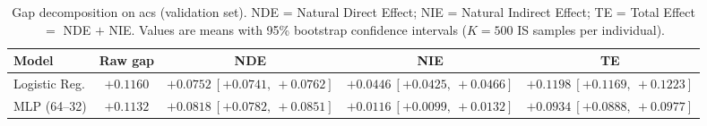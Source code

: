 \begin{table}[htbp]
  \centering
  \caption{Gap decomposition on acs (validation set). NDE = Natural Direct Effect; NIE = Natural Indirect Effect; TE = Total Effect $=$ NDE $+$ NIE. Values are means with 95\% bootstrap confidence intervals ($K=500$ IS samples per individual).}
  \label{tab:acs_gap_overall}
  \begin{tabular}{lcccc}
    \toprule
    Model & Raw gap & NDE & NIE & TE \\
    \midrule
    Logistic Reg. & $+0.1160$ & $+0.0752\ [+0.0741,\ +0.0762]$ & $+0.0446\ [+0.0425,\ +0.0466]$ & $+0.1198\ [+0.1169,\ +0.1223]$ \\
    MLP (64--32) & $+0.1132$ & $+0.0818\ [+0.0782,\ +0.0851]$ & $+0.0116\ [+0.0099,\ +0.0132]$ & $+0.0934\ [+0.0888,\ +0.0977]$ \\
    \bottomrule
  \end{tabular}
\end{table}